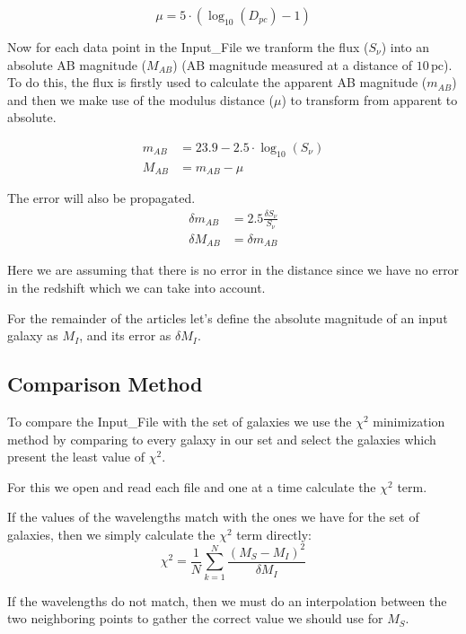 \documentclass[11pt]{report}
\newcommand{\unit}[1]{\ensuremath{\, \mathrm{#1}}}
\begin{document}
\begin{equation}
\mu = 5 \cdot ( \log_{10}( D_{pc}) - 1)
\end{equation}

Now for each data point in the Input\_File we tranform the flux ($S_\nu$) into an absolute AB magnitude ($M_{AB}$) (AB magnitude measured at a distance of $10 \unit{pc}$). To do this, the flux is firstly used to calculate the apparent AB magnitude ($m_{AB}$) and then we make use of the modulus distance ($\mu$) to transform from apparent to absolute.

\begin{align}
m_{AB} &= 23.9 - 2.5 \cdot \log_{10}(S_\nu)\\
M_{AB} &= m_{AB} - \mu
\end{align}

The error will also be propagated.
\begin{align*}
\delta m_{AB} &= 2.5 \frac{\delta S_\nu}{S_\nu}\\
\delta M_{AB} &= \delta m_{AB}
\end{align*}

Here we are assuming that there is no error in the distance since we have no error in the redshift which we can take into account.

For the remainder of the articles let's define the absolute magnitude of an input galaxy as $M_{I}$, and its error as $\delta M_I$.

\subsection{Comparison Method}
To compare the Input\_File with the set of galaxies we use the $\chi^2$ minimization method by comparing to every galaxy in our set and select the galaxies which present the least value of $\chi^2$.

For this we open and read each file and one at a time calculate the $\chi^2$ term.

If the values of the wavelengths match with the ones we have for the set of galaxies, then we simply calculate the $\chi^2$ term directly:
\begin{equation}
\chi^2 = \frac{1}{N}\sum_{k=1}^N \frac{(M_S - M_I)^2}{\delta M_I}
\end{equation}

If the wavelengths do not match, then we must do an interpolation between the two neighboring points to gather the correct value we should use for $M_S$. 
\end{document}
